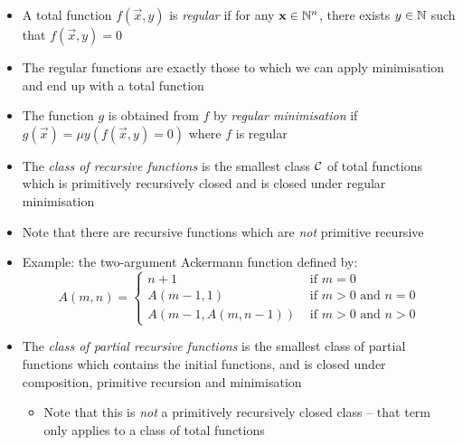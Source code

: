 \begin{itemize}
	
	\item A total function $ f(\vec{x}, y) $ is \textit{regular} if for any $ \mathbf{x} \in \mathbb{N}^n $, there exists $ y \in \mathbb{N} $ such that $ f(\vec{x}, y) = 0 $
	
	\item The regular functions are exactly those to which we can apply minimisation and end up with a total function
	
	\item The function $ g $ is obtained from $ f $ by \textit{regular minimisation} if $ g(\vec{x}) = \mu y (f(\vec{x}, y) = 0) $ where $ f $ is regular
	
	\item The \textit{class of recursive functions} is the smallest class $ \mathcal{C} $ of total functions which is primitively recursively closed and is closed under regular minimisation
	
	\item Note that there are recursive functions which are \textit{not} primitive recursive
	
	\item Example: the two-argument Ackermann function defined by:
	\begin{equation*}
	A(m, n) = \begin{cases}
	n + 1 &\text{ if } m = 0\\
	A(m - 1, 1) &\text{ if } m > 0 \text{ and } n = 0\\
	A(m - 1, A(m, n - 1)) &\text{ if } m > 0 \text{ and } n > 0
	\end{cases}
	\end{equation*}
	
	\item The \textit{class of partial recursive functions} is the smallest class of partial functions which contains the initial functions, and is closed under composition, primitive recursion and minimisation
	
	\begin{itemize}
		\item Note that this is \textit{not} a primitively recursively closed class -- that term only applies to a class of total functions
	\end{itemize}
	
\end{itemize}